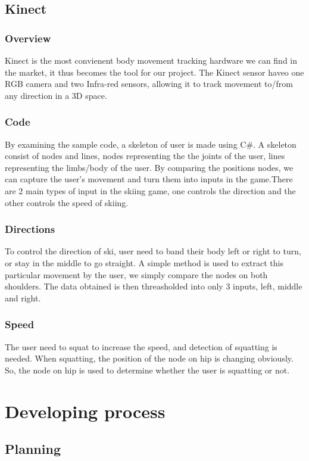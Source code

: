 \documentclass[fonts]{icst}
\begin{document}
\subsection{Kinect}
\subsubsection{Overview}
Kinect is the most convienent body movement tracking hardware we can find in the market, it thus becomes the tool for our project. The Kinect sensor haveo one RGB camera and two Infra-red sensors, allowing it to track movement to/from any direction in a 3D space. 

\subsubsection{Code}
By examining the sample code, a skeleton of user is made using C\#. A skeleton consist of nodes and lines, nodes representing the the joints of the user, lines representing the limbs/body of the user. By comparing the positions nodes, we can capture the user's movement and turn them into inputs in the game.There are 2 main types of input in the skiing game, one controls the direction and the other controls the speed of skiing.

\subsubsection{Directions}
To control the direction of ski, user need to band their body left or right to turn, or stay in the middle to go straight. A simple method is used to extract this particular movement by the user, we simply compare the nodes on both shoulders. The data obtained is then threasholded into only 3 inputs, left, middle and right. 

\subsubsection{Speed}
The user need to squat to increase the speed, and detection of squatting is needed. When squatting, the position of the node on hip is changing obviously. So, the node on hip is used to determine whether the user is squatting or not.


\section{Developing process}
\subsection{Planning}
\end{document}
